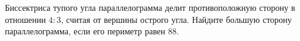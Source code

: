 \begin{ex}
	\begin{condition}
		Биссектриса тупого угла параллелограмма делит противоположную сторону в отношении \(4:3\), считая от вершины острого угла. Найдите большую сторону параллелограмма, если его периметр равен \( 88 \).
	\end{condition}
\end{ex}